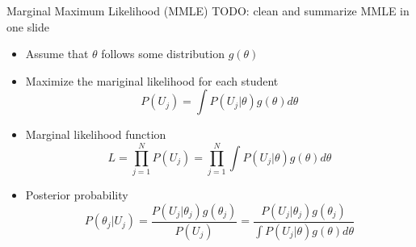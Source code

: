 \documentclass{beamer}
\theoremstyle{definition}
\begin{document}
%

\begin{frame}{Marginal Maximum Likelihood (MMLE)}
  TODO: clean and summarize MMLE in one slide %
\begin{itemize}
  \item Assume that $\theta$ follows some distribution $g(\theta)$
  \item Maximize the mariginal likelihood for each student
  \[P(U_j) = \int P(U_j | \theta) g(\theta) d\theta\]
  \item<2-> Marginal likelihood function
  \[L = \prod_{j=1}^N P(U_j) = \prod_{j=1}^N \int P(U_j | \theta) g(\theta) d\theta\]
  \item<3-> Posterior probability
  \[P(\theta_j | U_j) = \frac{P(U_j | \theta_j) g(\theta_j)}{P(U_j)} = \frac{P(U_j | \theta_j) g(\theta_j)}{\int P(U_j | \theta) g(\theta) d\theta}\]
\end{itemize}
\end{frame}
\end{document}
